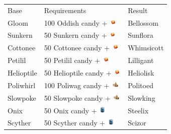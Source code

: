 \begin{table}
\footnotesize
\centering
  \begin{tabular}{lll}
    Base & Requirements & Result \\
    \Midrule
    Gloom & 100 Oddish candy + \includegraphics[width=1em,height=1em]{images/sunstone.png} & Bellossom \\
    Sunkern & 50 Sunkern candy + \includegraphics[width=1em,height=1em]{images/sunstone.png} & Sunflora \\
    Cottonee & 50 Cottonee candy + \includegraphics[width=1em,height=1em]{images/sunstone.png} & Whimsicott \\
    Petilil & 50 Petilil candy + \includegraphics[width=1em,height=1em]{images/sunstone.png} & Lilligant \\
    Helioptile & 50 Helioptile candy + \includegraphics[width=1em,height=1em]{images/sunstone.png} & Heliolisk \\
    Poliwhirl & 100 Poliwag candy + \includegraphics[width=1em,height=1em]{images/kingsrock.png} & Politoed \\
    Slowpoke & 50 Slowpoke candy + \includegraphics[width=1em,height=1em]{images/kingsrock.png} & Slowking \\
    Onix & 50 Onix candy + \includegraphics[width=1em,height=1em]{images/metalcoat.png} & Steelix \\
    Scyther & 50 Scyther candy + \includegraphics[width=1em,height=1em]{images/metalcoat.png} & Scizor \\

\end{tabular}
\end{table}

